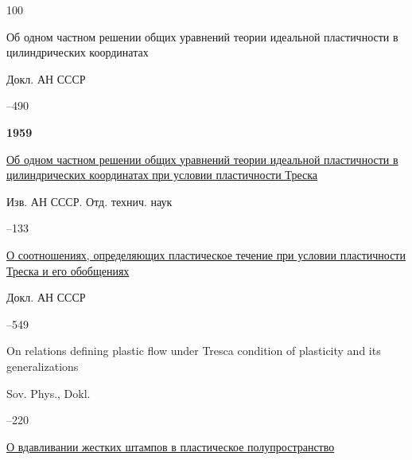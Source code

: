 \begin{thebibliography}{100}

\paper Об одном частном решении общих уравнений теории идеальной пластичности в цилиндрических координатах 

\jour Докл. АН СССР




–490





\item[] \centerline{\bf 1959}




\paper \href{https://zbmath.org/?q=an:0112.17203}{Об одном частном решении общих уравнений теории идеальной пластичности в цилиндрических координатах при условии пластичности Треска} 

\jour Изв. АН СССР. Отд. технич. наук



–133





\paper \href{https://zbmath.org/?q=an:0088.40801}{О соотношениях, определяющих пластическое течение при условии пластичности Треска и его обобщениях} 

\jour Докл. АН СССР




–549


\transl


\paper On relations defining plastic flow under Tresca condition of plasticity and its generalizations

\jour Sov. Phys., Dokl. 


--220 







\paper \href{https://zbmath.org/?q=an:0099.18501}{О вдавливании жестких штампов в пластическое полупространство}


\end{thebibliography}
